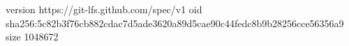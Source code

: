 version https://git-lfs.github.com/spec/v1
oid sha256:5c82b3f76cb882cdac7d5ade3620a89d5cae90c44fedc8b9b28256cce56356a9
size 1048672
